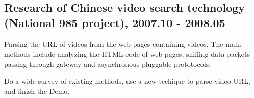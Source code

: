 \documentclass[letterpaper]{article}
\renewenvironment{itemize}{
  \begin{list}{}{
    \setlength{\leftmargin}{1.5em}
    \setlength{\itemsep}{0pt}
  }
}{
  \end{list}
}
\begin{document}
\subsection*{Research of Chinese video search technology (National 985 project), 2007.10 - 2008.05}
\begin{itemize}
\item Parsing the URL of videos from the web pages containing videos. The main methods include analyzing the HTML code of web pages, sniffing data packets passing through gateway and asynchronous pluggable prototocols.
\item Do a wide survey of existing methods, use a new techique to parse video URL, and finish the Demo.
\end{itemize}



\end{document}
